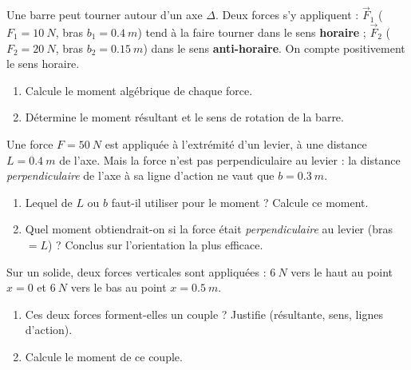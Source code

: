 \documentclass[11pt,a4paper]{article}
\newcommand{\vv}[1]{\vec{#1}}\newcommand{\ds}{\displaystyle}
\begin{document}
\begin{exo}
Une barre peut tourner autour d'un axe $\Delta$. Deux forces s'y appliquent : $\vv F_1$
($F_1=\qty{10}{N}$, bras $b_1=\qty{0.4}{m}$) tend à la faire tourner dans le sens \textbf{horaire} ;
$\vv F_2$ ($F_2=\qty{20}{N}$, bras $b_2=\qty{0.15}{m}$) dans le sens \textbf{anti-horaire}. On compte
positivement le sens horaire.
\begin{enumerate}[label=\alph*)]
  \item Calcule le moment algébrique de chaque force.
  \item Détermine le moment résultant et le sens de rotation de la barre.
\end{enumerate}
\end{exo}

\begin{exo}
Une force $F=\qty{50}{N}$ est appliquée à l'extrémité d'un levier, à une distance $L=\qty{0.4}{m}$ de
l'axe. Mais la force n'est pas perpendiculaire au levier : la distance \emph{perpendiculaire} de l'axe
à sa ligne d'action ne vaut que $b=\qty{0.3}{m}$.
\begin{enumerate}[label=\alph*)]
  \item Lequel de $L$ ou $b$ faut-il utiliser pour le moment ? Calcule ce moment.
  \item Quel moment obtiendrait-on si la force était \emph{perpendiculaire} au levier (bras $=L$) ?
        Conclus sur l'orientation la plus efficace.
\end{enumerate}
\end{exo}

\begin{exo}
Sur un solide, deux forces verticales sont appliquées : $\qty{6}{N}$ vers le haut au point $x=0$ et
$\qty{6}{N}$ vers le bas au point $x=\qty{0.5}{m}$.
\begin{center}
\end{center}
\begin{enumerate}[label=\alph*)]
  \item Ces deux forces forment-elles un couple ? Justifie (résultante, sens, lignes d'action).
  \item Calcule le moment de ce couple.
\end{enumerate}
\end{exo}
\end{document}
